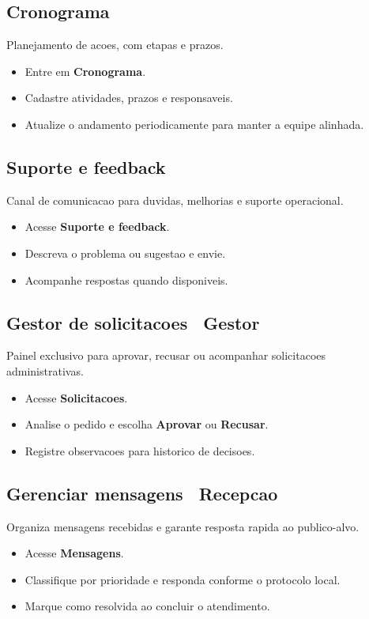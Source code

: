 \documentclass[12pt,a4paper]{article}
\begin{document}
\subsection{Cronograma}
Planejamento de acoes, com etapas e prazos.
\begin{itemize}[leftmargin=*]
  \item Entre em \textbf{Cronograma}.
  \item Cadastre atividades, prazos e responsaveis.
  \item Atualize o andamento periodicamente para manter a equipe alinhada.
\end{itemize}

\subsection{Suporte e feedback}
Canal de comunicacao para duvidas, melhorias e suporte operacional.
\begin{itemize}[leftmargin=*]
  \item Acesse \textbf{Suporte e feedback}.
  \item Descreva o problema ou sugestao e envie.
  \item Acompanhe respostas quando disponiveis.
\end{itemize}

\subsection{Gestor de solicitacoes \textemdash\ Gestor}
Painel exclusivo para aprovar, recusar ou acompanhar solicitacoes administrativas.
\begin{itemize}[leftmargin=*]
  \item Acesse \textbf{Solicitacoes}.
  \item Analise o pedido e escolha \textbf{Aprovar} ou \textbf{Recusar}.
  \item Registre observacoes para historico de decisoes.
\end{itemize}

\subsection{Gerenciar mensagens \textemdash\ Recepcao}
Organiza mensagens recebidas e garante resposta rapida ao publico-alvo.
\begin{itemize}[leftmargin=*]
  \item Acesse \textbf{Mensagens}.
  \item Classifique por prioridade e responda conforme o protocolo local.
  \item Marque como resolvida ao concluir o atendimento.
\end{itemize}
\end{document}
